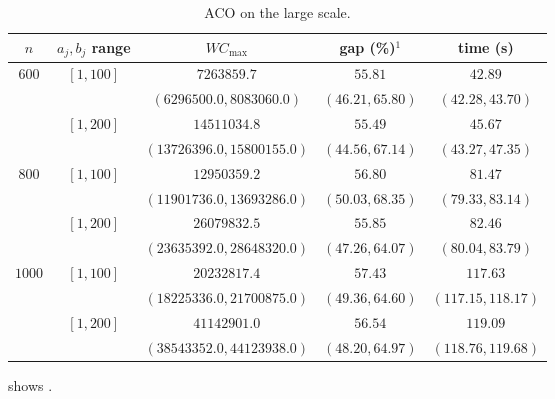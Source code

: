 \documentclass[12pt]{article}
\newlength{\resultstabwidth}
\newcommand{\resultstable}{%
    \centering
    \footnotesize
    \setlength{\tabcolsep}{4pt}%
    \renewcommand{\arraystretch}{1.15}}
\begin{document}
\begin{sloppypar}
\begin{table}[H]
\resultstable
\caption{ACO on the large scale.}
\label{tab:results-large-aco}
\begin{tabular*}{\resultstabwidth}{@{\extracolsep{\fill}}ccccc@{}}
\toprule
$n$ & $a_j,b_j$ range & $W C_{\max}$ & gap (\%)$^{1}$ & time (s) \\
\midrule
\multirow{4}{*}{$600$} & $[1,100]$ & $7263859.7$ & $55.81$ & $42.89$ \\
                        &           & $(6296500.0, 8083060.0)$ & $(46.21, 65.80)$ & $(42.28, 43.70)$ \\
                        & $[1,200]$ & $14511034.8$ & $55.49$ & $45.67$ \\
                        &           & $(13726396.0, 15800155.0)$ & $(44.56, 67.14)$ & $(43.27, 47.35)$ \\
\midrule
\multirow{4}{*}{$800$} & $[1,100]$ & $12950359.2$ & $56.80$ & $81.47$ \\
                        &           & $(11901736.0, 13693286.0)$ & $(50.03, 68.35)$ & $(79.33, 83.14)$ \\
                        & $[1,200]$ & $26079832.5$ & $55.85$ & $82.46$ \\
                        &           & $(23635392.0, 28648320.0)$ & $(47.26, 64.07)$ & $(80.04, 83.79)$ \\
\midrule
\multirow{4}{*}{$1000$} & $[1,100]$ & $20232817.4$ & $57.43$ & $117.63$ \\
                        &           & $(18225336.0, 21700875.0)$ & $(49.36, 64.60)$ & $(117.15, 118.17)$ \\
                        & $[1,200]$ & $41142901.0$ & $56.54$ & $119.09$ \\
                        &           & $(38543352.0, 44123938.0)$ & $(48.20, 64.97)$ & $(118.76, 119.68)$ \\
\bottomrule
\end{tabular*}
\end{table}

 shows \TBD.


\end{sloppypar}
\end{document}
